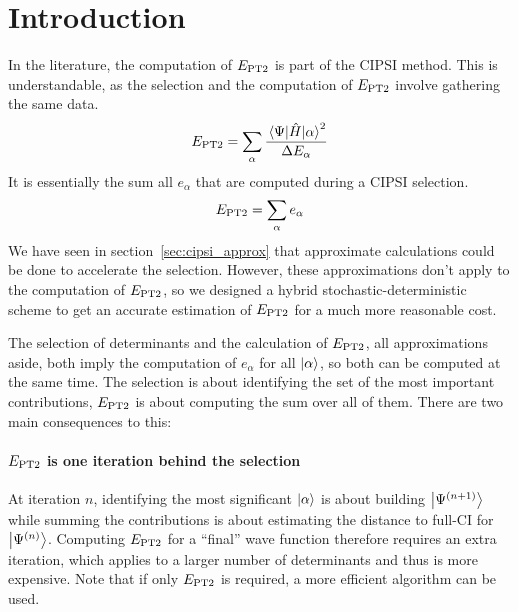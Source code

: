 \documentclass[./thesis.tex]{subfiles}
\begin{document}
\label{chap:PT2}

\section{Introduction}


In the literature, the computation of $E_\text{PT2}$ is part of the CIPSI method. This is understandable, as the selection and the computation of $E_\text{PT2}$ involve gathering the same data.
\begin{equation}
E_\text{PT2} = \sum_\alpha \frac{\mel{\Psi}{\hat{H}}{\alpha}^2}{\Delta E_\alpha}
\end{equation}
It is essentially the sum all $e_\alpha$ that are computed during a CIPSI selection.
\begin{equation}
E_\text{PT2} = \sum_\alpha e_\alpha
\end{equation}
We have seen in section~\ref{sec:cipsi_approx} that approximate calculations could be done to accelerate the selection. However, these approximations don't apply to the computation of $E_\text{PT2}$, so we designed a hybrid stochastic-deterministic scheme to get an accurate estimation of $E_\text{PT2}$ for a much more reasonable cost. 


The selection of determinants and the calculation of $E_\text{PT2}$, all approximations aside, both imply the computation of $e_\alpha$ for all $\ket \alpha$, so both can be computed at the same time. The selection is about identifying the set of the most important contributions, $E_\text{PT2}$ is about computing the sum over all of them. There are two main consequences to this:
\paragraph{$E_\text{PT2}$ is one iteration behind the selection}
At iteration $n$, identifying the most significant $\ket \alpha$ is about building $\ket {\Psi^{(n+1)}}$ while summing the contributions is about estimating the distance to full-CI for $\ket {\Psi^{(n)}}$. Computing $E_\text{PT2}$ for a ``final'' wave function therefore requires an extra iteration, which applies to a larger number of determinants and thus is more expensive. Note that if only $E_\text{PT2}$ is required, a more efficient algorithm can be used.\cite{Cimiraglia_1996}
\end{document}
